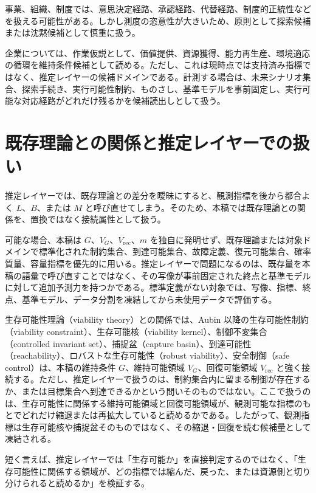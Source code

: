 \documentclass[12pt,a4paper]{article}
\begin{document}
事業、組織、制度では、意思決定経路、承認経路、代替経路、制度的正統性などを扱える可能性がある。しかし測度の恣意性が大きいため、原則として探索候補または沈黙候補として慎重に扱う。

企業については、作業仮説として、価値提供、資源獲得、能力再生産、環境適応の循環を維持条件候補として読める。ただし、これは現時点では支持済み指標ではなく、推定レイヤーの候補ドメインである。計測する場合は、未来シナリオ集合、探索手続き、実行可能性制約、ものさし、基準モデルを事前固定し、実行可能な対応経路がどれだけ残るかを候補読出しとして扱う。

\section{既存理論との関係と推定レイヤーでの扱い}\label{ux65e2ux5b58ux7406ux8ad6ux3068ux306eux95a2ux4fc2ux3068ux63a8ux5b9aux30ecux30a4ux30e4ux30fcux3067ux306eux6271ux3044}

推定レイヤーでは、既存理論との差分を曖昧にすると、観測指標を後から都合よく \(L\)、\(B\)、または \(M\) と呼び直せてしまう。そのため、本稿では既存理論との関係を、置換ではなく接続属性として扱う。

可能な場合、本稿は \(G\)、\(V_{G}\)、\(V_{\mathrm{rec}}\)、\(m\) を独自に発明せず、既存理論または対象ドメインで標準化された制約集合、到達可能集合、故障定義、復元可能集合、確率質量、容量指標を優先的に用いる。推定レイヤーで問題になるのは、既存量を本稿の語彙で呼び直すことではなく、その写像が事前固定された終点と基準モデルに対して追加予測力を持つかである。標準定義がない対象では、写像、指標、終点、基準モデル、データ分割を凍結してから未使用データで評価する。

生存可能性理論（viability theory）との関係では、Aubin 以降の生存可能性制約（viability constraint）、生存可能核（viability kernel）、制御不変集合（controlled invariant set）、捕捉盆（capture basin）、到達可能性（reachability）、ロバストな生存可能性（robust viability）、安全制御（safe control）は、本稿の維持条件 \(G\)、維持可能領域 \(V_{G}\)、回復可能領域 \(V_{\mathrm{rec}}\) と強く接続する。ただし、推定レイヤーで扱うのは、制約集合内に留まる制御が存在するか、または目標集合へ到達できるかという問いそのものではない。ここで扱うのは、生存可能性に関係する維持可能領域と回復可能領域が、観測可能な指標のもとでどれだけ縮退または再拡大していると読めるかである。したがって、観測指標は生存可能核や捕捉盆そのものではなく、その縮退・回復を読む候補量として凍結される。

短く言えば、推定レイヤーでは「生存可能か」を直接判定するのではなく、「生存可能性に関係する領域が、どの指標では縮んだ、戻った、または資源側と切り分けられると読めるか」を検証する。
\end{document}
